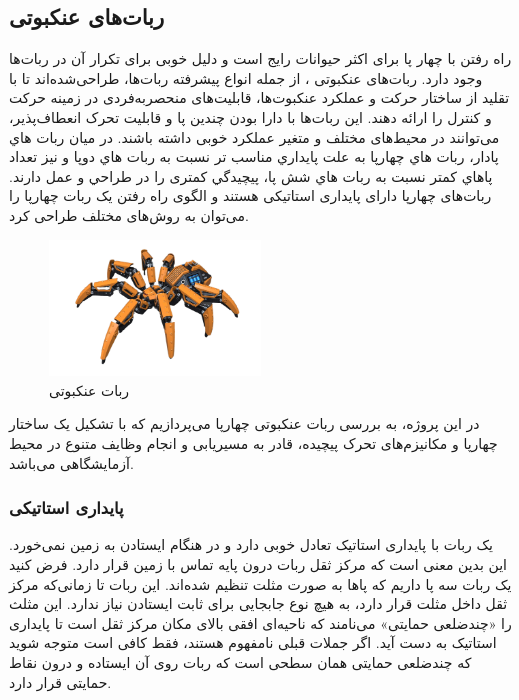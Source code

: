 \subsection{ربات‌های عنکبوتی}
راه رفتن با چهار پا برای اکثر حیوانات رایج است و دلیل خوبی برای تکرار آن در ربات‌ها وجود دارد. ربات‌های عنکبوتی
\noindent\unskip{}
، از جمله انواع پیشرفته ربات‌ها، طراحی‌شده‌اند تا با تقلید از ساختار حرکت و عملکرد عنکبوت‌ها، قابلیت‌های منحصربه‌فردی در زمینه حرکت و کنترل را ارائه دهند. این ربات‌ها با دارا بودن چندین پا و قابلیت تحرک انعطاف‌پذیر، می‌توانند در محیط‌های مختلف و متغیر عملکرد خوبی داشته باشند. در ميان ربات هاي پادار، ربات هاي چهارپا به علت پايداري مناسب تر نسبت به ربات هاي دو‌پا و نيز تعداد پاهاي كمتر نسبت به ربات هاي شش پا، پيچيدگي كمتری را در طراحي و عمل دارند. ربات‌های چهارپا دارای پایداری استاتیکی هستند و الگوی راه رفتن یک ربات چهارپا را می‌توان به روش‌های مختلف طراحی کرد.

\begin{figure}[H]
	\centering
	\includegraphics[width=0.5\textwidth]{./images/Chapter1/Spider2}	
	\caption[ربات عنکبوتی]{ربات عنکبوتی \cite{SpiderRobot}}
	\label{ربات عنکبوتی}
\end{figure}
\noindent
\unskip
در این پروژه، به بررسی ربات‌ عنکبوتی چهارپا می‌پردازیم که با تشکیل یک ساختار چهارپا و مکانیزم‌های تحرک پیچیده، قادر به مسیریابی و انجام وظایف متنوع در محیط‌ آزمایشگاهی می‌باشد.

\subsubsection{پایداری استاتیکی}

یک ربات با پایداری استاتیک تعادل خوبی دارد و در هنگام ایستادن به زمین نمی‌خورد. این بدین معنی است که مرکز ثقل ربات درون پایه تماس با زمین قرار دارد. فرض کنید یک ربات سه پا داریم که پاها به صورت مثلت تنظیم شده‌اند. این ربات تا زمانی‌که مرکز ثقل داخل مثلت قرار دارد، به هیچ نوع جابجایی برای ثابت ایستادن نیاز ندارد. این مثلث را «چند‌ضلعی حمایتی» می‌نامند که ناحیه‌ای افقی بالای مکان مرکز ثقل است تا پایداری استاتیک به دست آید. اگر جملات قبلی نامفهوم هستند، فقط کافی است متوجه شوید که چندضلعی حمایتی همان سطحی است که ربات روی آن ایستاده و درون نقاط حمایتی قرار دارد.

